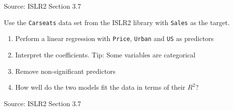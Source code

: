 \begin{withcode}
\begin{exerciseboxcomputer}
{\footnotesize \vspace{\baselineskip} Source: ISLR2 Section 3.7}
\end{exerciseboxcomputer}

\begin{exerciseboxcomputer}
\noindent Use the \texttt{Carseats} data set from the ISLR2 library with \texttt{Sales} as the target.
  \begin{enumerate}
     \item Perform a linear regression with \texttt{Price}, \texttt{Urban} and \texttt{US} as predictors
     \item Interpret the coefficients. Tip: Some variables are categorical
     \item Remove non-significant predictors
     \item How well do the two models fit the data in terms of their $R^2$?
  \end{enumerate}

{\footnotesize \vspace{\baselineskip} Source: ISLR2 Section 3.7}
\end{exerciseboxcomputer}
\end{withcode}


